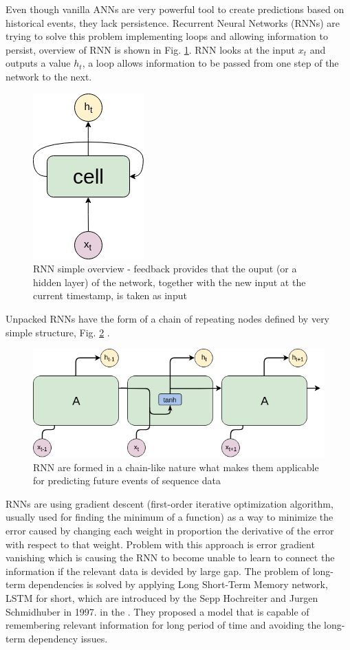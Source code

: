 \documentclass[11pt, a4paper]{article} %
\begin{document}
Even though vanilla ANNs are very powerful tool to create predictions based on historical events, they lack persistence. 
Recurrent Neural Networks (RNNs) are trying to solve this problem implementing loops and allowing information to persist, overview of RNN is shown in Fig. \ref{rnn}. RNN looks at the input $ x_{t} $ and outputs a value $ h_{t} $, a loop allows information to be passed from one step of the network to the next. 
\begin{figure}
	\centering
	\includegraphics[scale=.5]{images/RNN.png} %
	\caption{RNN simple overview - feedback provides that the ouput (or a hidden layer) of the network, together with the new input at the current timestamp, is taken as input}
	\label{rnn} 
\end{figure}
Unpacked RNNs have the form of a chain of repeating nodes defined by very simple structure, Fig. \ref{rnn-unpacked} \cite{Olah_lstm}.
\begin{figure}
	\centering
	\includegraphics[scale=.5]{images/RNN-unpacked.png} %
	\caption{RNN are formed in a chain-like nature what makes them applicable for predicting future events of sequence data}
	\label{rnn-unpacked} 
\end{figure}

RNNs are using gradient descent (first-order iterative optimization algorithm, usually used for finding the minimum of a function) as a way to minimize the error caused by changing each weight in proportion the derivative of the error with respect to that weight. Problem with this approach is error gradient vanishing which is causing the RNN to become unable to learn to connect the information if the relevant data is devided by large gap. 
The problem of long-term dependencies is solved by applying Long Short-Term Memory network, LSTM for short, which are introduced by the Sepp Hochreiter and Jurgen Schmidhuber in 1997. in the \cite{Hochreiter_LSTM}. They proposed a model that is capable of remembering relevant information for long period of time and avoiding the long-term dependency issues. 
\end{document}
